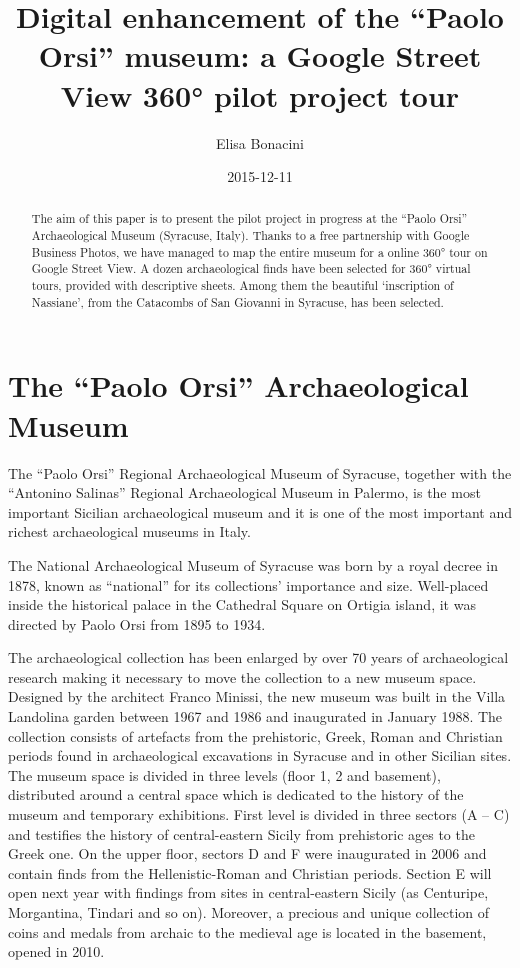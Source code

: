 \documentclass[amsthm,ebook]{saparticle}
\title{Digital enhancement of the ``Paolo Orsi'' museum: a Google Street View 360° pilot project tour}
\author[catania]{Elisa Bonacini\corref{first}}
\date{2015-12-11}
\begin{document}
 
\maketitle
\begin{abstract}
The aim of this paper is to present the pilot project in progress at the ``Paolo Orsi'' Archaeological Museum
(Syracuse, Italy). Thanks to a free partnership with Google Business Photos, we have managed to map the entire museum
for a online 360° tour on Google Street View. A dozen archaeological finds have been selected for 360° virtual tours,
provided with descriptive sheets. Among them the beautiful `inscription of Nassiane', from the Catacombs of San
Giovanni in Syracuse, has been selected.
\end{abstract}


\section{The ``Paolo Orsi'' Archaeological Museum}


\noindent The ``Paolo Orsi'' Regional Archaeological Museum of Syracuse, together with the ``Antonino Salinas'' Regional
Archaeological Museum in Palermo, is the most important Sicilian archaeological museum and it is one of the most
important and richest archaeological museums in Italy. 

The National Archaeological Museum of Syracuse was born by a royal decree in 1878, known as ``national'' for its
collections’ importance and size. Well-placed inside the historical palace in the Cathedral Square on Ortigia island,
it was directed by Paolo Orsi from 1895 to 1934. 

The archaeological collection has been enlarged by over 70 years of archaeological research making it necessary to move
the collection to a new museum space. Designed by the architect Franco Minissi, the new museum was built in the Villa
Landolina garden between 1967 and 1986 and inaugurated in January 1988. The collection consists of artefacts from the
prehistoric, Greek, Roman and Christian periods found in archaeological excavations in Syracuse and in other Sicilian
sites. The museum space is divided in three levels (floor 1, 2 and basement), distributed around a central space which
is dedicated to the history of the museum and temporary exhibitions. First level is divided in three sectors (A – C)
and testifies the history of central-eastern Sicily from prehistoric ages to the Greek one. On the upper floor, sectors
D and F were inaugurated in 2006 and contain finds from the Hellenistic-Roman and Christian periods. Section E will
open next year with findings from sites in central-eastern Sicily (as Centuripe, Morgantina, Tindari and so on).
Moreover, a precious and unique collection of coins and medals from archaic to the medieval age is located in the
basement, opened in 2010.
\end{document}

